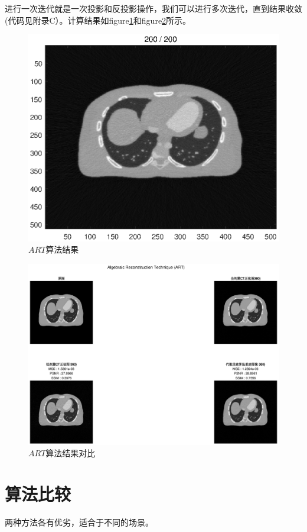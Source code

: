 \documentclass[hyperref]{ctexart}
\begin{document}
				进行一次迭代就是一次投影和反投影操作，我们可以进行多次迭代，直到结果收敛(代码见附录C）。计算结果如figure\ref{ART算法结果}和figure\ref{ART算法结果对比}所示。
				\begin{figure}[ht!]
				\centering
				\includegraphics[width=120mm]{ART_result2.eps}
				\caption{$ART$算法结果 \label{ART算法结果}}
		\end{figure}

				\begin{figure}[ht!]
				\centering
				\includegraphics[width=150mm]{ART_result.eps}
				\caption{$ART$算法结果对比 \label{ART算法结果对比}}
		\end{figure}
	\newpage
	\section{算法比较}
		两种方法各有优劣，适合于不同的场景。
\end{document}
